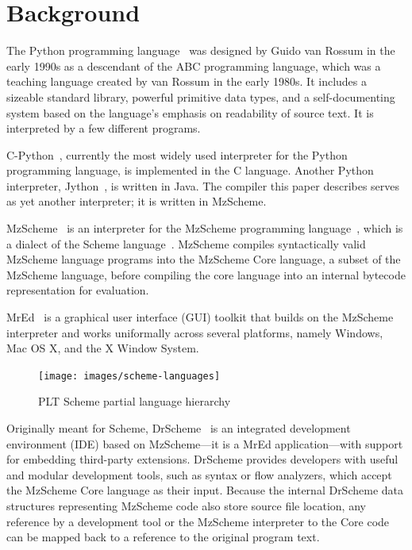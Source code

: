 \section{Background}
\label{background}

The Python programming language~\cite{pythonlang} was designed by Guido van Rossum in the early 1990s as a descendant of the ABC programming language, which was a teaching language created by van Rossum in the early 1980s.  It includes a sizeable standard library, powerful primitive data types, and a self-documenting system based on the language's emphasis on readability of source text.  It is interpreted by a few different programs.

C-Python~\cite{python}, currently the most widely used interpreter for the Python programming language, is implemented in the C language.  Another Python interpreter, Jython~\cite{jython}, is written in Java.  The compiler this paper describes serves as yet another interpreter; it is written in MzScheme.

MzScheme~\cite{mzscheme} is an interpreter for the MzScheme programming language~\cite{mzschemelang}, which is a dialect of the Scheme language~\cite{kelsey98revised}.  MzScheme compiles syntactically valid MzScheme language programs into the MzScheme Core language, a subset of the MzScheme language, before compiling the core language into an internal bytecode representation for evaluation.

MrEd~\cite{mred} is a graphical user interface (GUI) toolkit that builds on the MzScheme interpreter and works uniformally across several platforms, namely Windows, Mac OS X, and the X Window System.

\begin{figure}
	\caption{PLT Scheme partial language hierarchy}
	\label{schemelanguagesfig}
	\begin{center}
		\texttt{[image: images/scheme-languages]}
	\end{center}
\end{figure}


Originally meant for Scheme, DrScheme~\cite{bruce97drscheme} is an integrated development environment (IDE) based on MzScheme---it is a MrEd application---with support for embedding third-party extensions.  DrScheme provides developers with useful and modular development tools, such as syntax or flow analyzers, which accept the MzScheme Core language as their input.  Because the internal DrScheme data structures representing MzScheme code also store source file location, any reference by a development tool or the MzScheme interpreter to the Core code can be mapped back to a reference to the original program text.

